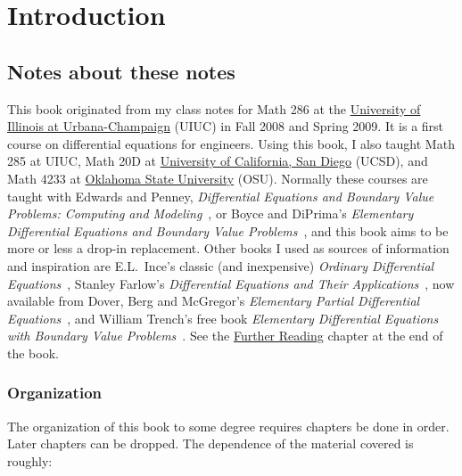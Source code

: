 \chapter*{Introduction} \label{intro:chapter}


\section{Notes about these notes}
\label{notes:section}


This book originated from my class notes for Math 286
at the \href{https://www.math.uiuc.edu/}{University of Illinois at
Urbana-Champaign} (UIUC)
in Fall 2008 and
Spring 2009.
It is a first course on differential equations for engineers.
Using this book, I also taught Math 285 at UIUC\@,
Math 20D at
\href{https://www.math.ucsd.edu/}{University of California, San Diego} (UCSD),
and Math 4233 at 
\href{https://math.okstate.edu/}{Oklahoma State University} (OSU).
Normally these courses are taught with
Edwards and Penney, \emph{Differential
Equations and Boundary Value Problems: Computing and Modeling}~\cite{EP}, or
Boyce and DiPrima's
\emph{Elementary
Differential Equations and Boundary Value Problems}~\cite{BD},
and this book aims to be more or less a drop-in replacement.
Other books I used as sources of information and inspiration
are E.L.\ Ince's classic (and inexpensive)
\emph{Ordinary Differential Equations}~\cite{I},
Stanley Farlow's \emph{Differential Equations and Their
Applications}~\cite{F}, now available from Dover,
Berg and McGregor's
\emph{Elementary Partial Differential Equations}~\cite{BM},
and William Trench's free book
\emph{Elementary
Differential Equations with Boundary Value Problems}~\cite{T}.
See the \hyperref[furtherreading:chapter]{Further Reading} chapter at the end of the book.

\subsection{Organization}

The organization of this book to some degree
requires chapters be done in order.
Later chapters can be dropped.
The dependence of the material covered is roughly:

